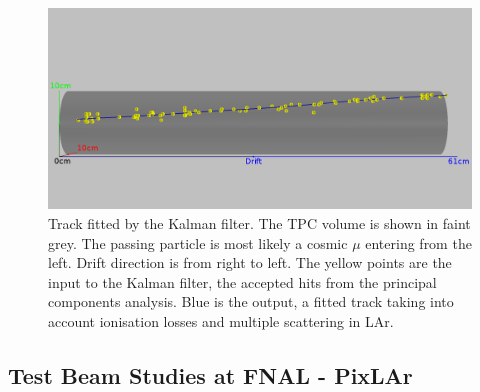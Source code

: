 \documentclass[a4paper]{article}
\begin{document}
\begin{figure}[htb]
	\centering
	\includegraphics[width=\textwidth]{Figures/event967_kalman}
	\caption{Track fitted by the Kalman filter.
		The TPC volume is shown in faint grey.
		The passing particle is most likely a cosmic $\mu$ entering from the left.
		Drift direction is from right to left.
		The yellow points are the input to the Kalman filter, the accepted hits from the principal components analysis.
		Blue is the output, a fitted track taking into account ionisation losses and multiple scattering in LAr.}
	\label{fig:kalman}
\end{figure}

\subsection{Test Beam Studies at FNAL - PixLAr}	
\end{document}
